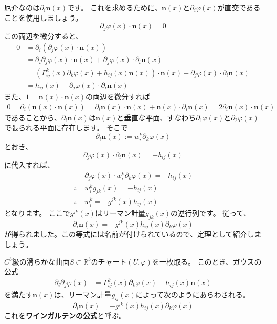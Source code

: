 厄介なのは$\partial_i\mathbf{n}(x)$です。
これを求めるために、$\mathbf{n}(x)$と$\partial_i\varphi(x)$が直交であることを使用しましょう。
\[
  \partial_j\varphi(x)\cdot\mathbf{n}(x)=0
\]
この両辺を微分すると、
\begin{align*}
  0&=\partial_i(\partial_j\varphi(x)\cdot\mathbf{n}(x))\\
  &=\partial_i\partial_j\varphi(x)\cdot\mathbf{n}(x)+\partial_j\varphi(x)\cdot\partial_i\mathbf{n}(x)\\
  &=\left(\Gamma_{ij}^k(x)\partial_k\varphi(x)+h_{ij}(x)\mathbf{n}(x)\right)\cdot\mathbf{n}(x)+\partial_j\varphi(x)\cdot\partial_i\mathbf{n}(x)\\
  &=h_{ij}(x)+\partial_j\varphi(x)\cdot\partial_i\mathbf{n}(x)
\end{align*}
また、$1=\mathbf{n}(x)\cdot\mathbf{n}(x)$の両辺を微分すれば
\begin{align*}
  0=\partial_i(\mathbf{n}(x)\cdot\mathbf{n}(x))=\partial_i\mathbf{n}(x)\cdot\mathbf{n}(x)+\mathbf{n}(x)\cdot\partial_i\mathbf{n}(x)=2\partial_i\mathbf{n}(x)\cdot\mathbf{n}(x)
\end{align*}
であることから、$\partial_i\mathbf{n}(x)$は$\mathbf{n}(x)$と垂直な平面、すなわち$\partial_1\varphi(x)$と$\partial_2\varphi(x)$で張られる平面に存在します。
そこで
\[
  \partial_i\mathbf{n}(x):=w_i^k\partial_k\varphi(x)
\]
とおき、
\[
  \partial_j\varphi(x)\cdot\partial_i\mathbf{n}(x)=-h_{ij}(x)
\]
に代入すれば、
\begin{align*}
  &\partial_j\varphi(x)\cdot w_i^k\partial_k\varphi(x)=-h_{ij}(x)\\
  \therefore\;&w_i^kg_{jk}(x)=-h_{ij}(x)\\
  \therefore\;&w_i^k=-g^{jk}(x)h_{ij}(x)
\end{align*}
となります。
ここで$g^{jk}(x)$はリーマン計量$g_{jk}(x)$の逆行列です。
従って、
\[
  \partial_i\mathbf{n}(x)=-g^{jk}(x)h_{ij}(x)\partial_k\varphi(x)
\]
が得られました。この等式には名前が付けられているので、定理として紹介しましょう。
\begin{theorem}[ワインガルテンの公式]
  $C^3$級の滑らかな曲面$S\subset\mathbb{R}^3$のチャート$(U,\varphi)$を一枚取る。
  このとき、ガウスの公式
  \begin{align*}
    \partial_i\partial_j\varphi(x)&=\Gamma_{ij}^k(x)\partial_k\varphi(x)+h_{ij}(x)\mathbf{n}(x)
  \end{align*}
  を満たす$\mathbf{n}(x)$は、リーマン計量$g_{ij}(x)$によって次のようにあらわされる。
  \[
    \partial_i\mathbf{n}(x)=-g^{jk}(x)h_{ij}(x)\partial_k\varphi(x)
  \]
  これを\textbf{ワインガルテンの公式}と呼ぶ。
\end{theorem}

